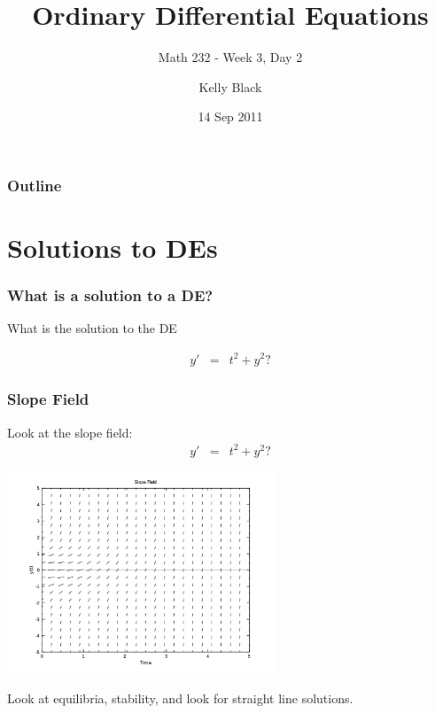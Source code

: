 \documentclass{beamer}
\begin{document}
\title{Ordinary Differential Equations}
\subtitle{Math 232 - Week 3, Day 2}

\author{Kelly Black}
\date{14 Sep 2011}

\begin{frame}
  \titlepage
\end{frame}

\begin{frame}
  \frametitle{Outline}
\end{frame}


\section{Solutions to DEs}


\begin{frame}
  \frametitle{What is a solution to a DE?}

  What is the solution to the DE

  \begin{eqnarray*}
    y' & = & t^2 + y^2?
  \end{eqnarray*}



\end{frame}


\begin{frame}
  \frametitle{Slope Field}

  Look at the slope field:
  \begin{eqnarray*}
    y' & = & t^2 + y^2?
  \end{eqnarray*}


  \includegraphics[height=6cm]{week3-D3SlopeExample}

  Look at equilibria, stability, and look for straight line solutions.

\end{frame}
\end{document}

